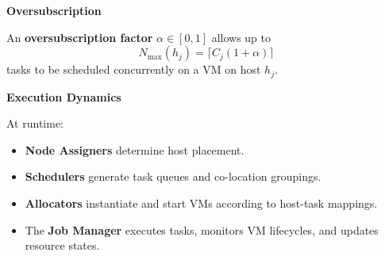 \textbf{Oversubscription}

An \textbf{oversubscription factor} $\alpha \in [0,1]$ allows up to
\[
    N_{\max}(h_j) = \lceil C_j (1 + \alpha) \rceil
\]
tasks to be scheduled concurrently on a VM on host $h_j$.


\textbf{Execution Dynamics}

At runtime:
\begin{itemize}
    \item \textbf{Node Assigners} determine host placement.
    \item \textbf{Schedulers} generate task queues and co-location groupings.
    \item \textbf{Allocators} instantiate and start VMs according to host-task mappings.
    \item The \textbf{Job Manager} executes tasks, monitors VM lifecycles, and updates resource states.
\end{itemize}

